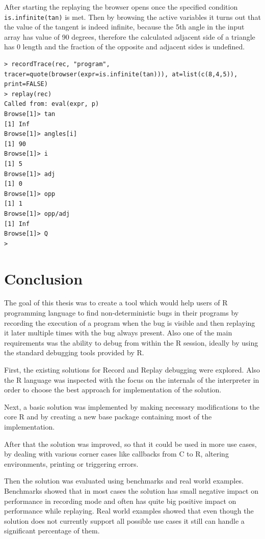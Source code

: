 \documentclass[thesis=M,english,hidelinks]{FITthesis}[2012/10/20]
\begin{document}
	After starting the replaying the browser opens once the specified condition \lstinline|is.infinite(tan)| is met. Then by browsing the active variables it turns out that the value of the tangent is indeed infinite, because the 5th angle in the input array has value of 90 degrees, therefore the calculated adjacent side of a triangle has 0 length and the fraction of the opposite and adjacent sides is undefined.\par
	
\pagebreak
\begin{lstlisting}[style=filestyle, caption={Example debugging session}]
> recordTrace(rec, "program", tracer=quote(browser(expr=is.infinite(tan))), at=list(c(8,4,5)), print=FALSE)
> replay(rec)
Called from: eval(expr, p)
Browse[1]> tan
[1] Inf
Browse[1]> angles[i]
[1] 90
Browse[1]> i
[1] 5
Browse[1]> adj
[1] 0
Browse[1]> opp
[1] 1
Browse[1]> opp/adj
[1] Inf
Browse[1]> Q
>
\end{lstlisting}

\chapter{Conclusion}
The goal of this thesis was to create a tool which would help users of R programming language to find non-deterministic bugs in their programs by recording the execution of a program when the bug is visible and then replaying it later multiple times with the bug always present. Also one of the main requirements was the ability to debug from within the R session, ideally by using the standard debugging tools provided by R.\par

First, the existing solutions for Record and Replay debugging were explored. Also the R language was inspected with the focus on the internals of the interpreter in order to choose the best approach for implementation of the solution.\par

Next, a basic solution was implemented by making necessary modifications to the core R and by creating a new base package containing most of the implementation.\par

After that the solution was improved, so that it could be used in more use cases, by dealing with various corner cases like callbacks from C to R, altering environments, printing or triggering errors.\par

Then the solution was evaluated using benchmarks and real world examples. Benchmarks showed that in most cases the solution has small negative impact on performance in recording mode and often has quite big positive impact on performance while replaying. Real world examples showed that even though the solution does not currently support all possible use cases it still can handle a significant percentage of them.\par
\end{document}
